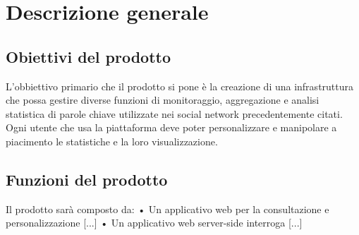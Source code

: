 
\section{Descrizione generale}

\subsection{Obiettivi del prodotto}
L'obbiettivo primario che il prodotto si pone è la creazione di una infrastruttura che
possa gestire diverse funzioni di monitoraggio, aggregazione e analisi statistica di parole chiave utilizzate nei social network precedentemente citati. Ogni utente che usa la piattaforma deve poter personalizzare e manipolare a piacimento le statistiche e la loro visualizzazione.

\subsection{Funzioni del prodotto}
Il prodotto sarà composto da:
• Un applicativo web per la consultazione e personalizzazione [...]
• Un applicativo web server-side interroga [...]

